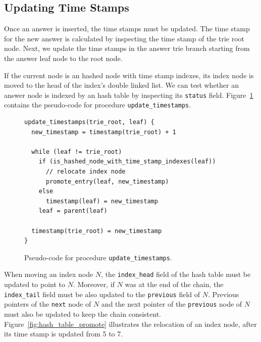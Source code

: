 \subsection{Updating Time Stamps}

Once an answer is inserted, the time stamps must be updated.
The time stamp for the new answer is calculated by inspecting the time stamp of the trie root node.
Next, we update the time stamps in the answer trie branch starting from the answer leaf node to the
root node.

If the current node is an hashed node with time stamp indexes,
its index node is moved to the head of
the index's double linked list. We can test whether an answer node is indexed by
an hash table by inspecting its \texttt{status} field.
Figure~\ref{fig:update_timestamps} contains the pseudo-code for procedure \texttt{update\_timestamps}.

\begin{figure}[ht]
\begin{Verbatim}
update_timestamps(trie_root, leaf) {
  new_timestamp = timestamp(trie_root) + 1
  
  while (leaf != trie_root)
    if (is_hashed_node_with_time_stamp_indexes(leaf))
      // relocate index node
      promote_entry(leaf, new_timestamp)
    else
      timestamp(leaf) = new_timestamp
    leaf = parent(leaf)
      
  timestamp(trie_root) = new_timestamp
}
\end{Verbatim}
\caption{Pseudo-code for procedure \texttt{update\_timestamps}.}
\label{fig:update_timestamps}
\end{figure}

When moving an index node $N$, the \texttt{index\_head} field of the hash table must be updated
to point to $N$. Moreover, if $N$ was at the end of the chain,
the \texttt{index\_tail} field must be also updated to the \texttt{previous} field of $N$.
Previous pointers of the \texttt{next} node of $N$ and the next pointer of
the \texttt{previous} node of $N$ must
also be updated to keep the chain consistent.
Figure~\ref{fig:hash_table_promote} illustrates the relocation of an index node, after
its time stamp is updated from 5 to 7.

